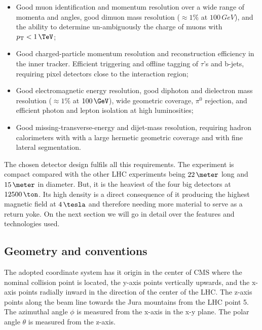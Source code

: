 \begin{itemize}
  \item Good muon identification and momentum resolution over a wide range of momenta and angles, good dimuon mass resolution ($\approx 1\%$ at $100\,GeV$), and the ability to determine un-ambiguously the charge of muons with $\pt<1\,\TeV$;
  \item Good charged-particle momentum resolution and reconstruction efficiency in the inner tracker. Efficient triggering and offline tagging of $\tau$'s and b-jets, requiring pixel detectors close to the interaction region;
  \item Good electromagnetic energy resolution, good diphoton and dielectron mass resolution ($\approx 1\%$ at $100\,\GeV$), wide geometric coverage, $\pi^0$ rejection, and efficient photon and lepton
isolation at high luminosities;
  \item Good missing-transverse-energy and dijet-mass resolution, requiring hadron calorimeters with with a large hermetic geometric coverage and with fine lateral segmentation.
\end{itemize}

The chosen detector design fulfils all this requirements. The experiment is compact compared with the other \gls{LHC} experiments being $22\,\meter$ long and $15\,\meter$ in diameter. But, it is the heaviest of the four big detectors at $12500\,\ton$. Its high density is a direct consequence of it producing the highest magnetic field at $4\,\tesla$ and therefore needing more material to serve as a return yoke. On the next section we will go in detail over the features and technologies used.

\subsection{Geometry and conventions}


The adopted coordinate system has it origin in the center of \gls{CMS} where the nominal collision point is located, the y-axis points vertically upwards, and the x-axis points radially inward in the direction of the center of the \gls{LHC}. The z-axis points along the beam line towards the Jura mountains from the \gls{LHC} point 5. The azimuthal angle $\phi$ is measured from the x-axis in the x-y plane. The polar angle $\theta$ is measured from the z-axis.

